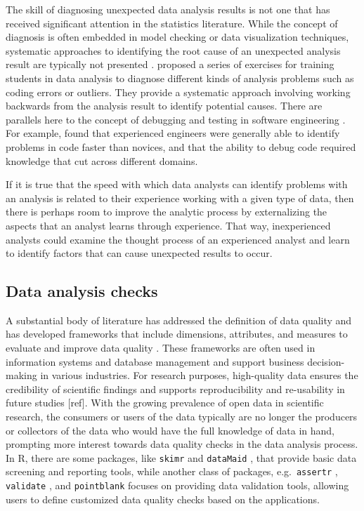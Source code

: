 \documentclass[
  12pt,
]{interact}
\begin{document}
The skill of diagnosing unexpected data analysis results is not one that
has received significant attention in the statistics literature. While
the concept of diagnosis is often embedded in model checking or data
visualization techniques, systematic approaches to identifying the root
cause of an unexpected analysis result are typically not presented
\citep{peng2022perspective}. \citep{peng_diagnosing_2021} proposed a
series of exercises for training students in data analysis to diagnose
different kinds of analysis problems such as coding errors or outliers.
They provide a systematic approach involving working backwards from the
analysis result to identify potential causes. There are parallels here
to the concept of debugging and testing in software engineering
\citep{donoghue2021teaching}. For example, \citep{li2019towards} found
that experienced engineers were generally able to identify problems in
code faster than novices, and that the ability to debug code required
knowledge that cut across different domains.

If it is true that the speed with which data analysts can identify
problems with an analysis is related to their experience working with a
given type of data, then there is perhaps room to improve the analytic
process by externalizing the aspects that an analyst learns through
experience. That way, inexperienced analysts could examine the thought
process of an experienced analyst and learn to identify factors that can
cause unexpected results to occur.

\subsection{Data analysis checks}\label{data-analysis-checks}

A substantial body of literature has addressed the definition of data
quality \citep[more]{8642813} and has developed frameworks that include
dimensions, attributes, and measures to evaluate and improve data
quality
\citep{cai2015challenges, wang1996beyond, 6204995, woodall2014classification}.
These frameworks are often used in information systems and database
management and support business decision-making in various industries.
For research purposes, high-quality data ensures the credibility of
scientific findings and supports reproducibility and re-usability in
future studies {[}ref{]}. With the growing prevalence of open data in
scientific research, the consumers or users of the data typically are no
longer the producers or collectors of the data who would have the full
knowledge of data in hand, prompting more interest towards data quality
checks in the data analysis process. In R, there are some packages, like
\texttt{skimr} \citep{skimr} and \texttt{dataMaid} \citep{dataMaid},
that provide basic data screening and reporting tools, while another
class of packages, e.g.~\texttt{assertr} \citep{assertr},
\texttt{validate} \citep{validate}, and \texttt{pointblank}
\citep{pointblank} focuses on providing data validation tools, allowing
users to define customized data quality checks based on the
applications.
\end{document}

